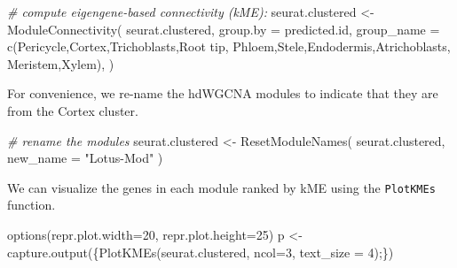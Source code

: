 \documentclass[
  letterpaper,
  DIV=11,
  numbers=noendperiod]{scrartcl}
\newenvironment{Shaded}{}{}
\newcommand{\AttributeTok}[1]{\textcolor[rgb]{0.49,0.56,0.16}{#1}}
\newcommand{\CommentTok}[1]{\textcolor[rgb]{0.38,0.63,0.69}{\textit{#1}}}
\newcommand{\DecValTok}[1]{\textcolor[rgb]{0.25,0.63,0.44}{#1}}
\newcommand{\FunctionTok}[1]{\textcolor[rgb]{0.02,0.16,0.49}{#1}}
\newcommand{\NormalTok}[1]{#1}
\newcommand{\OtherTok}[1]{\textcolor[rgb]{0.00,0.44,0.13}{#1}}
\newcommand{\StringTok}[1]{\textcolor[rgb]{0.25,0.44,0.63}{#1}}
\begin{document}
\begin{Shaded}
\begin{Highlighting}[]
\CommentTok{\# compute eigengene{-}based connectivity (kME):}
\NormalTok{seurat.clustered }\OtherTok{\textless{}{-}} \FunctionTok{ModuleConnectivity}\NormalTok{(}
\NormalTok{  seurat.clustered,}
  \AttributeTok{group.by =} \StringTok{\textquotesingle{}predicted.id\textquotesingle{}}\NormalTok{, }
  \AttributeTok{group\_name =} \FunctionTok{c}\NormalTok{(}\StringTok{\textquotesingle{}Pericycle\textquotesingle{}}\NormalTok{,}\StringTok{\textquotesingle{}Cortex\textquotesingle{}}\NormalTok{,}\StringTok{\textquotesingle{}Trichoblasts\textquotesingle{}}\NormalTok{,}\StringTok{\textquotesingle{}Root tip\textquotesingle{}}\NormalTok{,}
                 \StringTok{\textquotesingle{}Phloem\textquotesingle{}}\NormalTok{,}\StringTok{\textquotesingle{}Stele\textquotesingle{}}\NormalTok{,}\StringTok{\textquotesingle{}Endodermis\textquotesingle{}}\NormalTok{,}\StringTok{\textquotesingle{}Atrichoblasts\textquotesingle{}}\NormalTok{,}
                 \StringTok{\textquotesingle{}Meristem\textquotesingle{}}\NormalTok{,}\StringTok{\textquotesingle{}Xylem\textquotesingle{}}\NormalTok{),}
\NormalTok{)}
\end{Highlighting}
\end{Shaded}

For convenience, we re-name the hdWGCNA modules to indicate that they
are from the Cortex cluster.

\begin{Shaded}
\begin{Highlighting}[]
\CommentTok{\# rename the modules}
\NormalTok{seurat.clustered }\OtherTok{\textless{}{-}} \FunctionTok{ResetModuleNames}\NormalTok{(}
\NormalTok{  seurat.clustered,}
  \AttributeTok{new\_name =} \StringTok{"Lotus{-}Mod"}
\NormalTok{)}
\end{Highlighting}
\end{Shaded}

We can visualize the genes in each module ranked by kME using the
\texttt{PlotKMEs} function.

\begin{Shaded}
\begin{Highlighting}[]
\FunctionTok{options}\NormalTok{(}\AttributeTok{repr.plot.width=}\DecValTok{20}\NormalTok{, }\AttributeTok{repr.plot.height=}\DecValTok{25}\NormalTok{)}
\NormalTok{p }\OtherTok{\textless{}{-}} \FunctionTok{capture.output}\NormalTok{(\{}\FunctionTok{PlotKMEs}\NormalTok{(seurat.clustered, }\AttributeTok{ncol=}\DecValTok{3}\NormalTok{, }\AttributeTok{text\_size =} \DecValTok{4}\NormalTok{);\})}
\end{Highlighting}
\end{Shaded}
\end{document}
